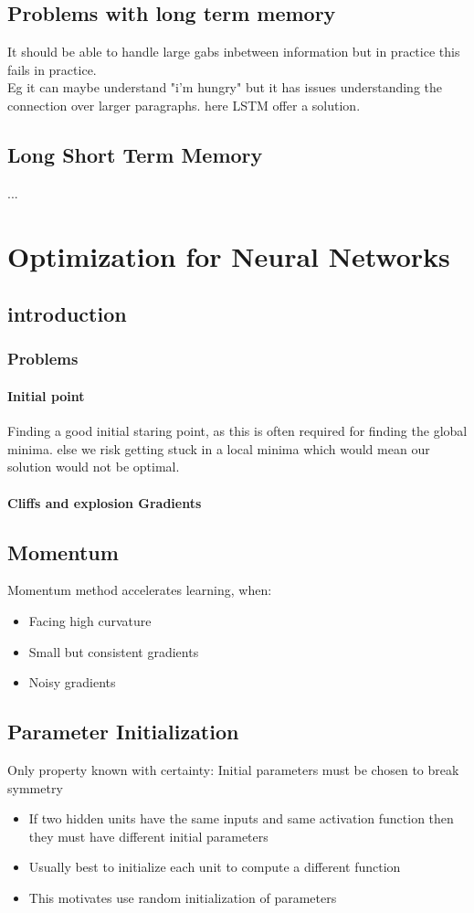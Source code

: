 \documentclass[a4paper,10pt,titlepage]{report}
\begin{document}
\subsection{Problems with long term memory}
It should be able to handle large gabs inbetween information but in practice this fails in practice.\\
Eg it can maybe understand "i'm hungry" but it has issues understanding the connection over larger paragraphs. here LSTM offer a solution.
\subsection{Long Short Term Memory}%
...

\newpage
\section{Optimization for Neural Networks}
\subsection{introduction}

\subsubsection{Problems}
\paragraph{Initial point}
Finding a good initial staring point, as this is often required for finding the global minima. else we risk getting stuck in a local minima which would mean our solution would not be optimal.
\paragraph{Cliffs and explosion Gradients}

\subsection{Momentum}
Momentum method accelerates learning, when:
\begin{itemize}
\item Facing high curvature
\item Small but consistent gradients
\item Noisy gradients
\end{itemize}

\subsection{Parameter Initialization}
Only property known with certainty: Initial parameters must be
chosen to break symmetry
\begin{itemize}
\item If two hidden units have the same inputs and same activation function then
they must have different initial parameters
\item Usually best to initialize each unit to compute a different function
\item This motivates use random initialization of parameters
\end{itemize}
\end{document}
